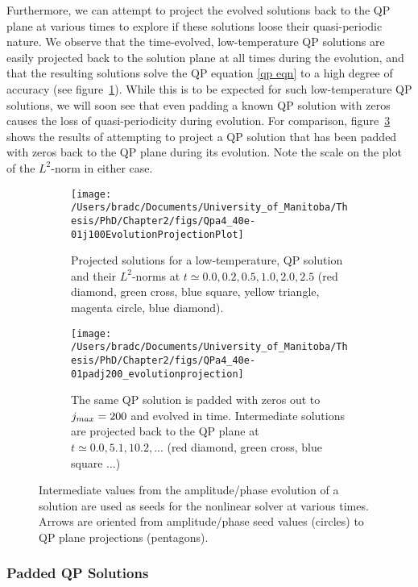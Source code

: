 \documentclass[../PhD.tex]{subfiles}
\begin{document}
Furthermore, we can attempt to project the evolved solutions back to the QP plane at various times to explore if these solutions loose their quasi-periodic nature. We observe that the time-evolved, low-temperature QP solutions are easily projected back to the solution plane at all times during the evolution, and that the resulting solutions solve the QP equation \eqref{qp eqn} to a high degree of accuracy (see figure~\ref{fig: Qpa4_40e-01j100EvolutionProjection}). While this is to be expected for such low-temperature QP solutions, we will soon see that even padding a known QP solution with zeros causes the loss of quasi-periodicity during evolution. For comparison, figure~\ref{fig: QPa4_40e-01padj200_evolutionprojection} shows the results of attempting to project a QP solution that has been padded with zeros back to the QP plane during its evolution. Note the scale on the plot of the $L^2$-norm in either case.

\begin{figure}[h]
	\centering
	\begin{subfigure}[t]{0.45\textwidth}
		\texttt{[image: /Users/bradc/Documents/University\_of\_Manitoba/Thesis/PhD/Chapter2/figs/Qpa4\_40e-01j100EvolutionProjectionPlot]}
		\caption{Projected solutions for a low-temperature, QP solution and their $L^2$-norms at $t\simeq 0.0, 0.2, 0.5, 1.0, 2.0, 2.5$ (red diamond, green cross, blue square, yellow triangle, magenta circle, blue diamond).}
		\label{fig: Qpa4_40e-01j100EvolutionProjection}
	\end{subfigure}
	\;
	\begin{subfigure}[t]{0.45\textwidth}
		\texttt{[image: /Users/bradc/Documents/University\_of\_Manitoba/Thesis/PhD/Chapter2/figs/QPa4\_40e-01padj200\_evolutionprojection]}
		\caption{The same QP solution is padded with zeros out to $j_{max} = 200$ and evolved in time. Intermediate solutions are projected back to the QP plane at $t \simeq 0.0, 5.1, 10.2, ...$ (red diamond, green cross, blue square ...)}
		\label{fig: QPa4_40e-01padj200_evolutionprojection}
	\end{subfigure}
	\caption{Intermediate values from the amplitude/phase evolution of a solution are used as seeds for the nonlinear solver at various times. Arrows are oriented from amplitude/phase seed values (circles) to QP plane projections (pentagons).}
\end{figure}


\subsubsection{Padded QP Solutions}
\end{document}
